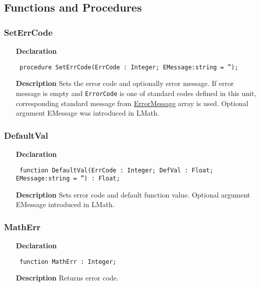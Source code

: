 \documentclass[12pt,a4paper,oneside]{report}
\newcommand{\lmath}[1]{   %
	\marginpar{\vspace{#1} 
		\begin{flushright}
			LMath
	\end{flushright} }
}
\newcommand{\declarationitem}[1]{\textbf{#1}}
\newcommand{\descriptiontitle}[1]{\textbf{#1}}
\newcommand{\code}[1]{\texttt{#1}}
\begin{document}
\subsection{Functions and Procedures}
\subsubsection{SetErrCode}\lmath{-24pt}
\label{uErrors-SetErrCode}
\begin{itemize}\item[\declarationitem{Declaration}\hfill]
	\begin{flushleft}
		\code{
			procedure SetErrCode(ErrCode : Integer; EMessage:string = '');}
	\end{flushleft}
	\item[\descriptiontitle{Description}]
	Sets the error code and optionally error message. If error message is empty and \code{ErrorCode} is one of standard codes 
defined in this unit, corresponding standard message from \hyperref[uErrors-ErrorMessage]{ErrorMessage} array is used. Optional argument EMessage was introduced in LMath.
\end{itemize}
\subsubsection{DefaultVal}\lmath{-24pt}
\label{uErrors-DefaultVal}
\begin{itemize}\item[\declarationitem{Declaration}\hfill]
	\begin{flushleft}
		\code{
			function DefaultVal(ErrCode : Integer; DefVal : Float; EMessage:string = '') : Float;}
		
	\end{flushleft}
	\item[\descriptiontitle{Description}]
	Sets error code and default function value. Optional argument EMessage introduced in LMath.
\end{itemize}
\subsubsection{MathErr}
\label{uErrors-MathErr}
\begin{itemize}\item[\declarationitem{Declaration}\hfill]
	\begin{flushleft}
		\code{
			function MathErr : Integer;}
	\end{flushleft}
	\item[\descriptiontitle{Description}]
	Returns error code.
\end{itemize}
\end{document}
